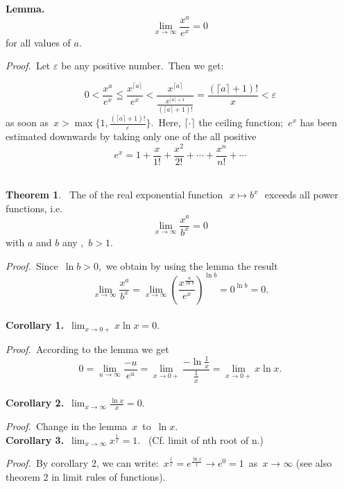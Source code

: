 \documentclass[12pt]{article}
\theoremstyle{definition}
\newtheorem*{thmplain}{Theorem}
\begin{document}
\textbf{Lemma.} 
   $$\lim_{x\to\infty}\frac{x^a}{e^x} = 0$$
for all  values of $a$.

{\em Proof.}\, Let $\varepsilon$ be any positive number.\, Then we get:

$$0 < \frac{x^a}{e^x} \leqq \frac{x^{\lceil a \rceil}}{e^x} < 
\frac{x^{\lceil a \rceil}}{\frac{x^{\lceil a\rceil+1}}{(\lceil a\rceil+1)!}}
 = \frac{(\lceil a\rceil+1)!}{x} < \varepsilon$$
as soon as\, $x > \max\{1, \frac{(\lceil a\rceil+1)!}{\varepsilon}\}$.\, Here, $\lceil\cdot\rceil$  the ceiling function;\, $e^x$ has been estimated downwards by taking only one of the all positive  
$$e^x = 1+\frac{x}{1!}+\frac{x^2}{2!}+\cdots+\frac{x^n}{n!}+\cdots$$\\

\begin{thmplain}
 \, The  of the real exponential function\,\, $x\mapsto b^x$\,\, exceeds all power functions, i.e.
     $$\lim_{x\to\infty}\frac{x^a}{b^x} = 0$$
with $a$ and $b$ any ,\, $b > 1$.
\end{thmplain}

{\em Proof.}\, Since\, $\ln b > 0$,\, we obtain by using the lemma the result
   $$\lim_{x\to\infty}\frac{x^a}{b^x} = 
\lim_{x\to\infty}\left(\frac{x^{\frac{a}{\ln b}}}{e^x}\right)^{\ln b} = 0^{\ln b} = 0.$$\\

\textbf{Corollary 1.}\,  $\displaystyle\lim_{x\to 0+}x\ln{x} = 0.$

{\em Proof.}\, According to the lemma we get
$$0 = \lim_{u\to\infty}\frac{-u}{e^u} = 
\lim_{x\to 0+}\frac{-\ln{\frac{1}{x}}}{\frac{1}{x}} = \lim_{x\to 0+}x\ln{x}.$$\\

\textbf{Corollary 2.}\,  $\displaystyle\lim_{x\to\infty}\frac{\ln{x}}{x} = 0.$

{\em Proof.}\, Change in the lemma\, $x$\, to\, $\ln{x}$.\\

\textbf{Corollary 3.}\,  $\displaystyle\lim_{x\to\infty}x^{\frac{1}{x}} = 1.$ \, (Cf. limit of nth root of n.)

{\em Proof.}\, By corollary 2, we can write:\, $\displaystyle x^{\frac{1}{x}} = e^{\frac{\ln{x}}{x}}\longrightarrow e^0 = 1$\, as\, $x\to\infty$ (see also theorem 2 in limit rules of functions).
\end{document}
